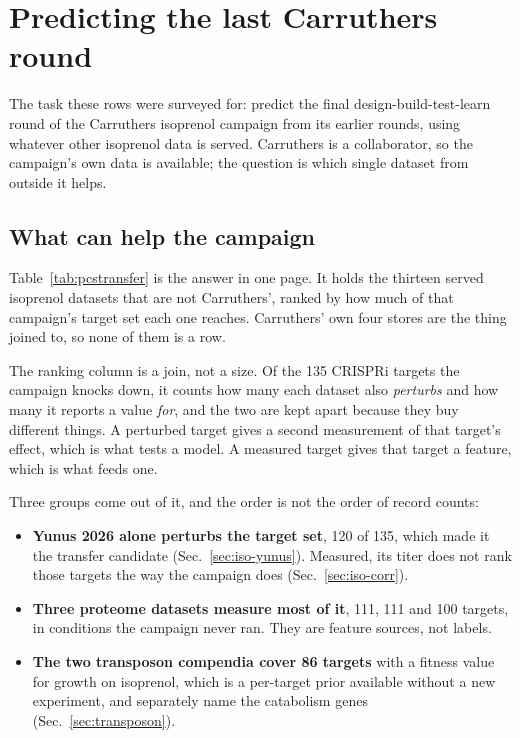 
\section{Predicting the last Carruthers round}\label{sec:isoprenol}

The task these rows were surveyed for: predict the final design-build-test-learn round
of the Carruthers isoprenol campaign from its earlier rounds, using whatever other
isoprenol data is served. Carruthers is a collaborator, so the campaign's own data is
available; the question is which single dataset from outside it helps.

\subsection{What can help the campaign}\label{sec:iso-transfer}

Table~\ref{tab:pcstransfer} is the answer in one page. It holds the thirteen served
isoprenol datasets that are not Carruthers', ranked by how much of that campaign's
target set each one reaches. Carruthers' own four stores are the thing joined to, so
none of them is a row.

The ranking column is a join, not a size. Of the 135 CRISPRi targets the campaign
knocks down, it counts how many each dataset also \emph{perturbs} and how many it
reports a value \emph{for}, and the two are kept apart because they buy different
things. A perturbed target gives a second measurement of that target's effect, which
is what tests a model. A measured target gives that target a feature, which is what
feeds one.

Three groups come out of it, and the order is not the order of record counts:

\begin{itemize}[nosep,leftmargin=1.4em]
\item \textbf{Yunus 2026 alone perturbs the target set}, 120 of 135, which made it the
transfer candidate (Sec.~\ref{sec:iso-yunus}). Measured, its titer does not rank those
targets the way the campaign does (Sec.~\ref{sec:iso-corr}).
\item \textbf{Three proteome datasets measure most of it}, 111, 111 and 100 targets,
in conditions the campaign never ran. They are feature sources, not labels.
\item \textbf{The two transposon compendia cover 86 targets} with a fitness value for
growth on isoprenol, which is a per-target prior available without a new experiment,
and separately name the catabolism genes (Sec.~\ref{sec:transposon}).
\end{itemize}

